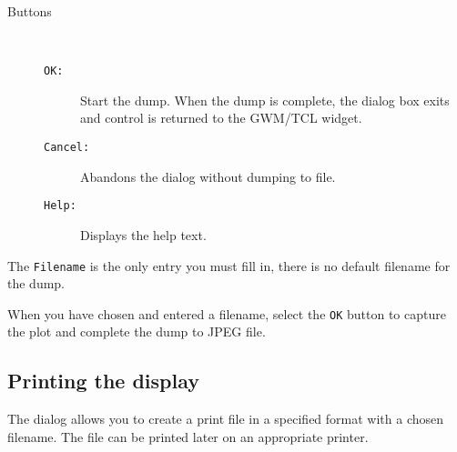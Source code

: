 \documentclass[twoside,11pt,nolof]{starlink}
\begin{document}
\begin{description}
\item[Buttons]~

\begin{description}

\item[{\texttt{OK:}}] Start the dump.  When the dump is complete, the
{} dialog box exits and control is returned to the GWM/TCL
widget.

\item[{\texttt{Cancel:}}] Abandons the {} dialog without
dumping to file.

\item[{\texttt{Help:}}] Displays the help text.

\end{description}

\end{description}

The {\texttt{Filename}} is the only entry you must fill in, there is no
default filename for the dump.

When you have chosen and entered a filename, select the {\texttt{OK}} button to
capture the plot and complete the dump to JPEG file.

\subsection{\label{printing_the_display}Printing the display}

The {} dialog allows you to create a print file in a
specified format with a chosen filename.   The file can be printed
later on an appropriate printer.
\end{document}
